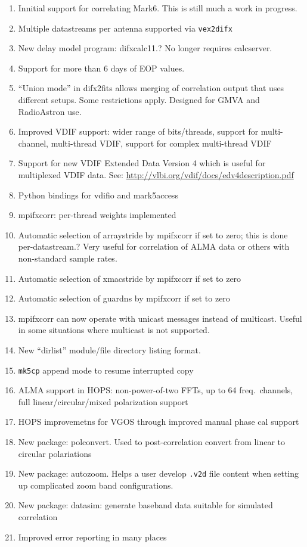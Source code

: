 \begin{enumerate}

\item Innitial support for correlating Mark6. This is still much a work in progress.
\item Multiple datastreams per antenna supported via {\tt vex2difx}
\item New delay model program: difxcalc11.? No longer requires calcserver.
\item Support for more than 6 days of EOP values.
\item ``Union mode'' in difx2fits allows merging of correlation output that uses different setups. Some restrictions apply. Designed for GMVA and RadioAstron use.
\item Improved VDIF support: wider range of bits/threads, support for multi-channel, multi-thread VDIF, support for complex multi-thread VDIF
\item Support for new VDIF Extended Data Version 4 which is useful for multiplexed VDIF data. See: \url{http://vlbi.org/vdif/docs/edv4description.pdf}
\item Python bindings for vdifio and mark5access
\item mpifxcorr: per-thread weights implemented
\item Automatic selection of arraystride by mpifxcorr if set to zero; this is done per-datastream.? Very useful for correlation of ALMA data or others with non-standard sample rates.
\item Automatic selection of xmacstride by mpifxcorr if set to zero
\item Automatic selection of guardns by mpifxcorr if set to zero
\item mpifxcorr can now operate with unicast messages instead of multicast. Useful in some situations where multicast is not
supported.
\item New ``dirlist'' module/file directory listing format. 
\item {\tt mk5cp} append mode to resume interrupted copy
\item ALMA support in HOPS: non-power-of-two FFTs, up to 64 freq.\ channels, full linear/circular/mixed polarization support
\item HOPS improvemetns for VGOS through improved manual phase cal support
\item New package: polconvert. Used to post-correlation convert from linear to circular polariations
\item New package: autozoom. Helps a user develop {\tt .v2d} file content when setting up complicated zoom band configurations.
\item New package: datasim: generate baseband data suitable for simulated correlation
\item Improved error reporting in many places

\end{enumerate}

